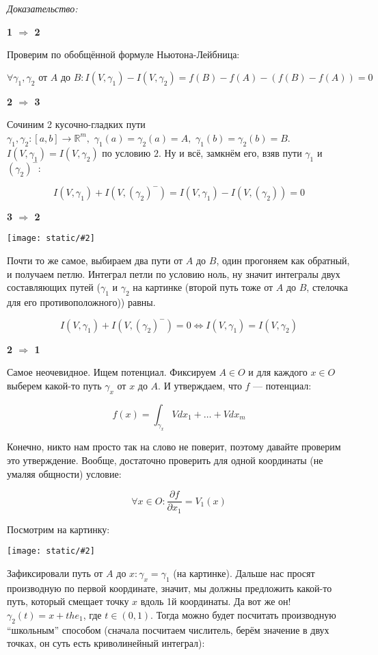 \documentclass{article}
\def\dbl{\,\,}
\def\images#1#2{\begin{center}\texttt{[image: static/\#2]}\end{center}}
\begin{document}
\textit{Доказательство:}

\textbf{1 $\Rightarrow$ 2}

Проверим по обобщённой формуле Ньютона-Лейбница:

\[\forall \gamma_1, \gamma_2 \text{ от } A \text{ до } B: I(V, \gamma_1) - I(V, \gamma_2) = f(B) - f(A) - (f(B) - f(A)) = 0\]

\textbf{2 $\Rightarrow$ 3}

Сочиним 2 кусочно-гладких пути $\gamma_1, \gamma_2: [a, b] \rightarrow \mathbb{R}^m, \dbl \gamma_1(a) = \gamma_2(a) = A, \dbl \gamma_1(b) = \gamma_2(b) = B$. $I(V, \gamma_1) = I(V, \gamma_2)$ по условию $2$. Ну и всё, замкнём его, взяв пути $\gamma_1$ и $(\gamma_2)^-$:

\[I(V, \gamma_1) + I(V, (\gamma_2)^-) = I(V, \gamma_1) - I(V, (\gamma_2)) = 0\]

\textbf{3 $\Rightarrow$ 2}

\images{0.3}{harakt_pot_vp_1.jpg}

Почти то же самое, выбираем два пути от $A$ до $B$, один прогоняем как обратный, и получаем петлю. Интеграл петли по условию ноль, ну значит интегралы двух составляющих путей ($\gamma_1$ и $\gamma_2$ на картинке (второй путь тоже от $A$ до $B$, стелочка для его противоположного)) равны.

\[I(V, \gamma_1) + I(V, (\gamma_2)^-) = 0 \Leftrightarrow I(V, \gamma_1) = I(V, \gamma_2)\]

\textbf{2 $\Rightarrow$ 1}

Самое неочевидное. Ищем потенциал. Фиксируем $A \in O$ и для каждого $x \in O$ выберем какой-то путь $\gamma_x$ от $x$ до $A$. И утверждаем, что $f$ --- потенциал:

\[f(x) = \int_{\gamma_x} Vdx_1 + \ldots + Vdx_m\]

Конечно, никто нам просто так на слово не поверит, поэтому давайте проверим это утверждение. Вообще, достаточно проверить для одной координаты (не умаляя общности) условие:

\[\forall x \in O : \frac{\partial f}{\partial x_1} = V_1(x)\]

Посмотрим на картинку:

\images{0.5}{harakt_pot_vp_2.jpg}

Зафиксировали путь от $A$ до $x: \gamma_x = \gamma_1$ (на картинке). Дальше нас просят производную по первой координате, значит, мы должны предложить какой-то путь, который смещает точку $x$ вдоль 1й координаты. Да вот же он! $\gamma_2(t) = x + the_1$, где $t \in (0, 1)$. Тогда можно будет посчитать производную ``школьным'' способом (сначала посчитаем числитель, берём значение в двух точках, он суть есть криволинейный интеграл):
\end{document}
